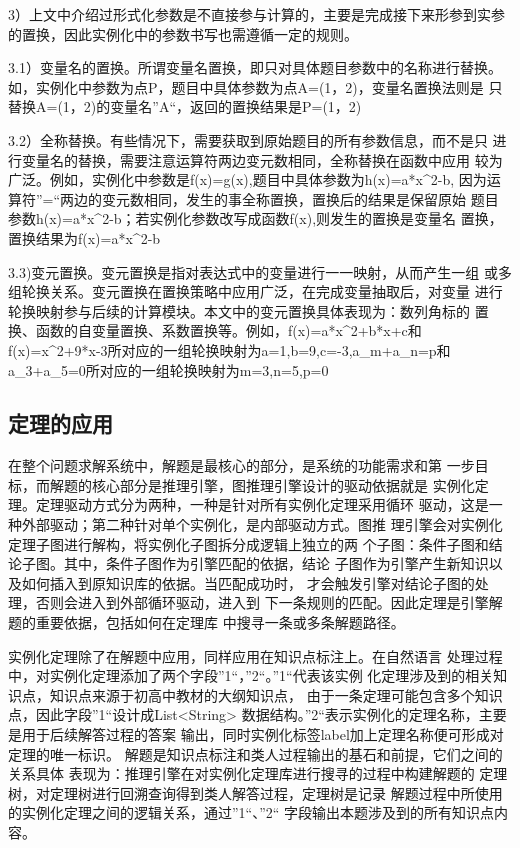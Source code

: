 \documentclass{standalone}
\begin{document}
3）上文中介绍过形式化参数是不直接参与计算的，主要是完成接下来形参到实参
的置换，因此实例化中的参数书写也需遵循一定的规则。

3.1）变量名的置换。所谓变量名置换，即只对具体题目参数中的名称进行替换。
如，实例化中参数为点P，题目中具体参数为点A=(1，2)，变量名置换法则是
只替换A=(1，2)的变量名”A“，返回的置换结果是P=(1，2)

3.2）全称替换。有些情况下，需要获取到原始题目的所有参数信息，而不是只
进行变量名的替换，需要注意运算符两边变元数相同，全称替换在函数中应用
较为广泛。例如，实例化中参数是f(x)=g(x),题目中具体参数为h(x)=a*x^2-b,
因为运算符”=“两边的变元数相同，发生的事全称置换，置换后的结果是保留原始
题目参数h(x)=a*x^2-b；若实例化参数改写成函数f(x),则发生的置换是变量名
置换，置换结果为f(x)=a*x^2-b

3.3)变元置换。变元置换是指对表达式中的变量进行一一映射，从而产生一组
或多组轮换关系。变元置换在置换策略中应用广泛，在完成变量抽取后，对变量
进行轮换映射参与后续的计算模块。本文中的变元置换具体表现为：数列角标的
置换、函数的自变量置换、系数置换等。例如，f(x)=a*x^2+b*x+c和
f(x)=x^2+9*x-3所对应的一组轮换映射为{a=1,b=9,c=-3},a_m+a_n=p和
a_3+a_5=0所对应的一组轮换映射为{m=3,n=5,p=0}

\subsection{定理的应用}
在整个问题求解系统中，解题是最核心的部分，是系统的功能需求和第
一步目标，而解题的核心部分是推理引擎，图推理引擎设计的驱动依据就是
实例化定理。定理驱动方式分为两种，一种是针对所有实例化定理采用循环
驱动，这是一种外部驱动；第二种针对单个实例化，是内部驱动方式。图推
理引擎会对实例化定理子图进行解构，将实例化子图拆分成逻辑上独立的两
个子图：条件子图和结论子图。其中，条件子图作为引擎匹配的依据，结论
子图作为引擎产生新知识以及如何插入到原知识库的依据。当匹配成功时，
才会触发引擎对结论子图的处理，否则会进入到外部循环驱动，进入到
下一条规则的匹配。因此定理是引擎解题的重要依据，包括如何在定理库
中搜寻一条或多条解题路径。

实例化定理除了在解题中应用，同样应用在知识点标注上。在自然语言
处理过程中，对实例化定理添加了两个字段”1“，”2“。”1“代表该实例
化定理涉及到的相关知识点，知识点来源于初高中教材的大纲知识点，
由于一条定理可能包含多个知识点，因此字段”1“设计成List<String>
数据结构。”2“表示实例化的定理名称，主要是用于后续解答过程的答案
输出，同时实例化标签label加上定理名称便可形成对定理的唯一标识。
解题是知识点标注和类人过程输出的基石和前提，它们之间的关系具体
表现为：推理引擎在对实例化定理库进行搜寻的过程中构建解题的
定理树，对定理树进行回溯查询得到类人解答过程，定理树是记录
解题过程中所使用的实例化定理之间的逻辑关系，通过”1“、”2“
字段输出本题涉及到的所有知识点内容。
\end{document}
